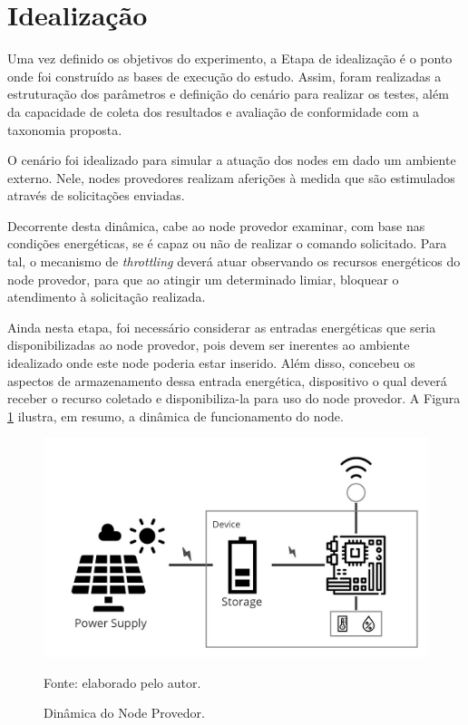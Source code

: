 \section{Idealização}
\label{cap6:idealizacao}
Uma vez definido os objetivos do experimento, a Etapa de idealização é o ponto onde foi construído as bases de execução do estudo. Assim, foram realizadas a estruturação  dos parâmetros e definição do cenário para realizar os testes, além da capacidade de coleta dos resultados e avaliação de conformidade com a taxonomia proposta.

O cenário foi idealizado para simular a atuação dos nodes em dado um ambiente externo. Nele, nodes provedores realizam aferições à medida que são estimulados através de solicitações enviadas. 

Decorrente desta  dinâmica, cabe ao node provedor examinar, com base nas condições energéticas, se é capaz ou não de realizar o comando solicitado. Para tal, o mecanismo de \textit{throttling} deverá atuar observando os recursos energéticos do node provedor, para que ao atingir um determinado limiar, bloquear o atendimento à solicitação realizada.

Ainda nesta etapa, foi necessário considerar as entradas energéticas que seria disponibilizadas ao node provedor, pois devem ser inerentes ao ambiente idealizado onde este node poderia estar inserido. Além disso, concebeu os aspectos de armazenamento dessa entrada energética, dispositivo o qual deverá receber o recurso coletado e disponibiliza-la para uso do node provedor. A Figura \ref{fig:cap6dinamica} ilustra, em resumo, a dinâmica de funcionamento do node.

\begin{figure}[H]
	\centering
	
	\caption{Dinâmica do Node Provedor.}
	\label{fig:cap6dinamica}
	\noindent\includegraphics[width=0.75\linewidth]{Imagens/cap6/cap6dinamica.jpg} 
		
	Fonte: elaborado pelo autor.
\end{figure}


